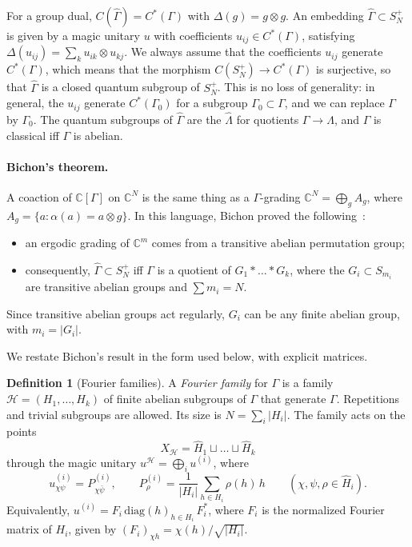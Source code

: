 \documentclass[11pt]{amsart}
\theoremstyle{definition}
\newtheorem{definition}[theorem]{Definition}
\theoremstyle{remark}
\theoremstyle{plain}
\numberwithin{equation}{section}
\numberwithin{table}{section}
\newcommand{\C}{\mathbb C}
\begin{document}
For a group dual, $C(\widehat\Gamma)=C^*(\Gamma)$ with $\Delta(g)=g\otimes g$. An embedding $\widehat\Gamma\subset S_N^+$ is given by a magic unitary $u$ with coefficients $u_{ij}\in C^*(\Gamma)$, satisfying $\Delta(u_{ij})=\sum_ku_{ik}\otimes u_{kj}$. We always assume that the coefficients $u_{ij}$ generate $C^*(\Gamma)$, which means that the morphism $C(S_N^+)\to C^*(\Gamma)$ is surjective, so that $\widehat\Gamma$ is a closed quantum subgroup of $S_N^+$. This is no loss of generality: in general, the $u_{ij}$ generate $C^*(\Gamma_0)$ for a subgroup $\Gamma_0\subset\Gamma$, and we can replace $\Gamma$ by $\Gamma_0$. The quantum subgroups of $\widehat\Gamma$ are the $\widehat\Lambda$ for quotients $\Gamma\to\Lambda$, and $\widehat\Gamma$ is classical iff $\Gamma$ is abelian.

\paragraph{Bichon's theorem.}
A coaction of $\C[\Gamma]$ on $\C^N$ is the same thing as a $\Gamma$-grading $\C^N=\bigoplus_gA_g$, where $A_g=\{a:\alpha(a)=a\otimes g\}$. In this language, Bichon proved the following~\cite[Prop.~5.2, Cor.~5.3]{bi}:
\begin{itemize}
\item an ergodic grading of $\C^m$ comes from a transitive abelian permutation group;
\item consequently, $\widehat\Gamma\subset S_N^+$ iff $\Gamma$ is a quotient of $G_1*\dots*G_k$, where the $G_i\subset S_{m_i}$ are transitive abelian groups and $\sum m_i=N$.
\end{itemize}
Since transitive abelian groups act regularly, $G_i$ can be any finite abelian group, with $m_i=|G_i|$.

We restate Bichon's result in the form used below, with explicit matrices.

\begin{definition}[Fourier families]\label{def:family}
A \emph{Fourier family} for $\Gamma$ is a family $\mathcal H=(H_1,\dots,H_k)$ of finite abelian subgroups of $\Gamma$ that generate $\Gamma$. Repetitions and trivial subgroups are allowed. Its size is $N=\sum_i|H_i|$. The family acts on the points
\[
X_{\mathcal H}=\widehat H_1\sqcup\dots\sqcup\widehat H_k
\]
through the magic unitary $u^{\mathcal H}=\bigoplus_iu^{(i)}$, where
\[
u^{(i)}_{\chi\psi}=P^{(i)}_{\chi\bar\psi},\qquad P^{(i)}_\rho=\frac1{|H_i|}\sum_{h\in H_i}\rho(h)\,h\qquad(\chi,\psi,\rho\in\widehat H_i).
\]
Equivalently, $u^{(i)}=F_i\,\mathrm{diag}(h)_{h\in H_i}\,F_i^*$, where $F_i$ is the normalized Fourier matrix of $H_i$, given by $(F_i)_{\chi h}=\chi(h)/\sqrt{|H_i|}$.
\end{definition}
\end{document}
